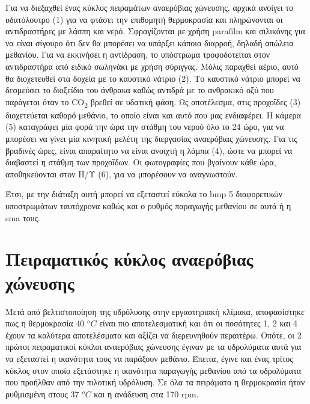 \documentclass[11pt]{report}
\begin{document}
Για να διεξαχθεί ένας κύκλος πειραμάτων αναερόβιας χώνευσης, αρχικά ανοίγει το υδατόλουτρο (1) για να φτάσει την επιθυμητή θερμοκρασία και πληρώνονται οι αντιδραστήρες με λάσπη και νερό. Σφραγίζονται με χρήση parafilm και σιλικόνης για να είναι σίγουρο ότι δεν θα μπορέσει να υπάρξει κάποια διαρροή, δηλαδή απώλεια μεθανίου. Για να εκκινήσει η αντίδραση, το υπόστρωμα τροφοδοτείται στον αντιδραστήρα από ειδικό σωληνάκι με χρήση σύριγγας. Μόλις παραχθεί αέριο, αυτό θα διοχετευθεί στα δοχεία με το καυστικό νάτριο (2). Το καυστικό νάτριο μπορεί να δεσμεύσει το διοξείδιο του άνθρακα καθώς αντιδρά με το ανθρακικό οξύ που παράγεται όταν το CO\textsubscript{2} βρεθεί σε υδατική φάση. Ως αποτέλεσμα, στις προχοΐδες (3) διοχετεύεται καθαρό μεθάνιο, το οποίο είναι και αυτό που μας ενδιαφέρει. Η κάμερα (5) καταγράφει μία φορά την ώρα την στάθμη του νερού όλο το 24 ώρο, για να μπορέσει να γίνει μία κινητική μελέτη της διεργασίας αναερόβιας χώνευσης. Για τις βραδινές ώρες, είναι απαραίτητο να είναι ανοιχτή η λάμπα (4), ώστε να μπορεί να διαβαστεί η στάθμη των προχοΐδων. Οι φωτογραφίες που βγαίνουν κάθε ώρα, αποθηκεύονται στον Η/Υ (6), για να μπορέσουν να αναγνωστούν.

Έτσι, με την διάταξη αυτή μπορεί να εξεταστεί εύκολα το \acrfull{bmp} 5 διαφορετικών υποστρωμάτων ταυτόχρονα καθώς και ο ρυθμός παραγωγής μεθανίου σε αυτά ή η \acrfull{sma} τους. 

\section{Πειραματικός κύκλος αναερόβιας χώνευσης}
\label{sec:org3e62b62}
Μετά από βελτιστοποίηση της υδρόλυσης στην εργαστηριακή κλίμακα, αποφασίστηκε πως η θερμοκρασία 40 \(^oC\) είναι πιο αποτελεσματική και ότι οι ποσότητες 1, 2 και 4 έχουν τα καλύτερα αποτελέσματα και αξίζει να διερευνηθούν περαιτέρω. Οπότε, οι 2 πρώτοι πειραματικοί κύκλοι αναερόβιας χώνευσης έγιναν με τα υδρολύματα αυτά για να εξεταστεί η ικανότητα τους να παράξουν μεθάνιο. Έπειτα, έγινε και ένας τρίτος κύκλος στον οποίο εξετάστηκε η ικανότητα παραγωγής μεθανίου από τα υδρολύματα που προήλθαν από την πιλοτική υδρόλυση. Σε όλα τα πειράματα η θερμοκρασία ήταν ρυθμισμένη στους 37 \(^oC\) και η ανάδευση στα 170 rpm.
\end{document}
